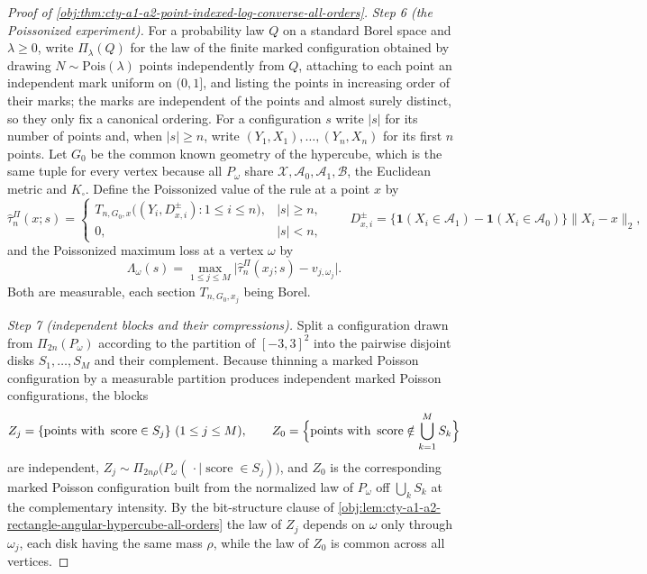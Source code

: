 \documentclass[11pt]{article}
\begin{document}
\begin{proof}[Proof of \cref{obj:thm:cty-a1-a2-point-indexed-log-converse-all-orders}]
\emph{Step 6 (the Poissonized experiment).}
For a probability law \(Q\) on a standard Borel space and \(\lambda\geq0\), write
\(\Pi_\lambda(Q)\) for the law of the finite marked configuration obtained by
drawing \(N\sim\mathrm{Pois}(\lambda)\) points independently from \(Q\),
attaching to each point an independent mark uniform on \((0,1]\), and listing
the points in increasing order of their marks; the marks are independent of the
points and almost surely distinct, so they only fix a canonical ordering.  For
a configuration \(s\) write \(|s|\) for its number of points and, when
\(|s|\geq n\), write \((Y_1,X_1),\ldots,(Y_n,X_n)\) for its first \(n\) points.
Let \(G_0\) be the common known geometry of the hypercube, which is the same
tuple for every vertex because all \(P_\omega\) share
\(\mathcal X,\mathcal A_0,\mathcal A_1,\mathcal B\), the Euclidean metric and
\(K_\square\).  Define the Poissonized value of the rule at a point \(x\) by
\[
\widehat\tau^{\Pi}_n(x;s)
=
\begin{cases}
T_{n,G_0,x}\bigl((Y_i,D^{\pm}_{x,i}):1\leq i\leq n\bigr),&|s|\geq n,\\
0,&|s|<n,
\end{cases}
\qquad
D^{\pm}_{x,i}=\bigl\{\mathbf 1(X_i\in\mathcal A_1)-\mathbf 1(X_i\in\mathcal A_0)\bigr\}
\lVert X_i-x\rVert_2 ,
\]
and the Poissonized maximum loss at a vertex \(\omega\) by
\[
\Lambda_\omega(s)=\max_{1\leq j\leq M}
\bigl|\widehat\tau^{\Pi}_n(x_j;s)-v_{j,\omega_j}\bigr| .
\]
Both are measurable, each section \(T_{n,G_0,x_j}\) being Borel.

\emph{Step 7 (independent blocks and their compressions).}
Split a configuration drawn from \(\Pi_{2n}(P_\omega)\) according to the
partition of \([-3,3]^2\) into the pairwise disjoint disks \(S_1,\ldots,S_M\)
and their complement.  Because thinning a marked Poisson configuration by a
measurable partition produces independent marked Poisson configurations, the
blocks
\[
Z_j=\{\text{points with }\operatorname{score}\in S_j\}\ (1\leq j\leq M),
\qquad
Z_0=\Bigl\{\text{points with }\operatorname{score}\notin\bigcup_{k=1}^M S_k\Bigr\}
\]
are independent, \(Z_j\sim\Pi_{2n\rho}\bigl(P_\omega(\,\cdot\mid \operatorname{score}\in S_j)\bigr)\),
and \(Z_0\) is the corresponding marked Poisson configuration built from the
normalized law of \(P_\omega\) off \(\bigcup_{k}S_k\) at the complementary
intensity.  By the bit-structure clause of
\cref{obj:lem:cty-a1-a2-rectangle-angular-hypercube-all-orders} the law of
\(Z_j\) depends on \(\omega\) only through \(\omega_j\), each disk having the
same mass \(\rho\), while the law of \(Z_0\) is common across all vertices.


\end{proof}
\end{document}
